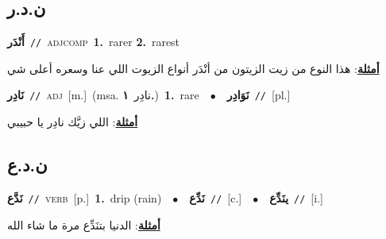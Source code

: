 \documentclass[10pt,a4paper,twoside]{article} %
\begin{document}
\begin{multicols}{2}
\vspace{-3mm}
\subsection*{\color{blue}\foreignlanguage{arabic}{ن.د.ر}\color{blue}{}} 

{\setlength\topsep{0pt}\textbf{\foreignlanguage{arabic}{أَنْدَر}}\ {\color{gray}\texttt{//}\color{black}}\ \textsc{adj\textunderscore comp}\ \textbf{1.}~rarer  \textbf{2.}~rarest\  \begin{flushright}\color{gray}\foreignlanguage{arabic}{\textbf{\underline{\foreignlanguage{arabic}{أمثلة}}}: هذا النوع من زيت الزيتون من أنْدَر أنواع الزيوت اللي عنا وسعره أعلى شي}\end{flushright}\color{black}} \vspace{2mm}

{\setlength\topsep{0pt}\textbf{\foreignlanguage{arabic}{نَادِر}}\ {\color{gray}\texttt{//}\color{black}}\ \textsc{adj}\ [m.]\ \color{gray}(msa. \foreignlanguage{arabic}{نادِر}~\foreignlanguage{arabic}{\textbf{١.}})\color{black}\ \textbf{1.}~rare\ \ $\bullet$\ \ \setlength\topsep{0pt}\textbf{\foreignlanguage{arabic}{نَوَادِر}}\ {\color{gray}\texttt{//}\color{black}}\ [pl.]\  \begin{flushright}\color{gray}\foreignlanguage{arabic}{\textbf{\underline{\foreignlanguage{arabic}{أمثلة}}}: اللي زيَّك نادِر يا حبيبي}\end{flushright}\color{black}} \vspace{2mm}

\vspace{-3mm}
\subsection*{\color{blue}\foreignlanguage{arabic}{ن.د.ع}\color{blue}{}} 

{\setlength\topsep{0pt}\textbf{\foreignlanguage{arabic}{نَدَّع}}\ {\color{gray}\texttt{//}\color{black}}\ \textsc{verb}\ [p.]\ \textbf{1.}~drip (rain)\ \ $\bullet$\ \ \setlength\topsep{0pt}\textbf{\foreignlanguage{arabic}{نَدِّع}}\ {\color{gray}\texttt{//}\color{black}}\ [c.]\ \ $\bullet$\ \ \setlength\topsep{0pt}\textbf{\foreignlanguage{arabic}{ينَدِّع}}\ {\color{gray}\texttt{//}\color{black}}\ [i.]\  \begin{flushright}\color{gray}\foreignlanguage{arabic}{\textbf{\underline{\foreignlanguage{arabic}{أمثلة}}}: الدنيا بتنَدِّع مرة ما شاء الله}\end{flushright}\color{black}} \vspace{2mm}


\end{multicols}
\end{document}
